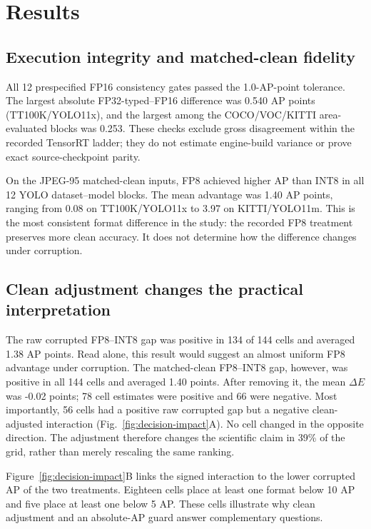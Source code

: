 \section{Results}
\label{sec:results}

\subsection{Execution integrity and matched-clean fidelity}
\label{sec:clean-results}

All 12 prespecified FP16 consistency gates passed the 1.0-AP-point tolerance.
The largest absolute FP32-typed--FP16 difference was 0.540 AP points
(TT100K/YOLO11x), and the largest among the COCO/VOC/KITTI area-evaluated
blocks was 0.253. These checks exclude gross disagreement within the recorded
TensorRT ladder; they do not estimate engine-build variance or prove exact
source-checkpoint parity.

On the JPEG-95 matched-clean inputs, FP8 achieved higher AP than INT8 in all 12
YOLO dataset--model blocks. The mean advantage was 1.40 AP points, ranging from
0.08 on TT100K/YOLO11x to 3.97 on KITTI/YOLO11m. This is the most consistent
format difference in the study: the recorded FP8 treatment preserves more clean
accuracy. It does not determine how the difference changes under corruption.

\subsection{Clean adjustment changes the practical interpretation}
\label{sec:decision-impact}

The raw corrupted FP8--INT8 gap was positive in 134 of 144 cells and averaged
1.38 AP points. Read alone, this result would suggest an almost uniform FP8
advantage under corruption. The matched-clean FP8--INT8 gap, however, was
positive in all 144 cells and averaged 1.40 points. After removing it, the mean
$\Delta E$ was -0.02 points; 78 cell estimates were positive and 66 were
negative. Most importantly, 56 cells had a positive raw corrupted gap but a
negative clean-adjusted interaction (Fig.~\ref{fig:decision-impact}A). No cell
changed in the opposite direction. The adjustment therefore changes the
scientific claim in 39\% of the grid, rather than merely rescaling the same
ranking.

Figure~\ref{fig:decision-impact}B links the signed interaction to the lower
corrupted AP of the two treatments. Eighteen cells place at least one format
below 10 AP and five place at least one below 5 AP. These cells illustrate why
clean adjustment and an absolute-AP guard answer complementary questions.


